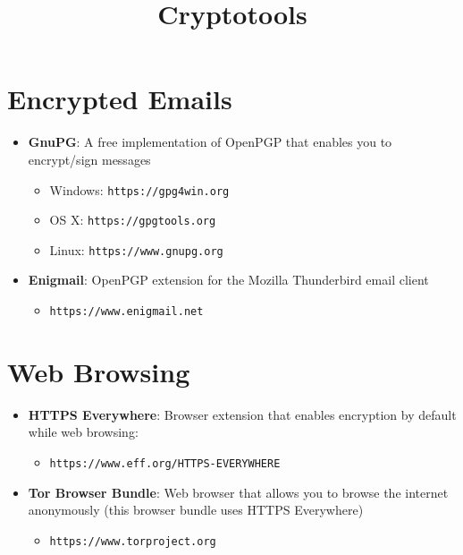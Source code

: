 \documentclass[8pt]{article}
\title{Cryptotools}
\date{}
\begin{document}
\maketitle

\section*{Encrypted Emails}

\begin{itemize}
   \item \textbf{GnuPG}: A free implementation of OpenPGP that enables you to encrypt/sign messages
      \begin{itemize}
         \item Windows: \texttt{https://gpg4win.org}
         \item OS X: \texttt{https://gpgtools.org}
         \item Linux: \texttt{https://www.gnupg.org}
      \end{itemize}
   \item \textbf{Enigmail}: OpenPGP extension for the Mozilla Thunderbird email client
      \begin{itemize}
         \item \texttt{https://www.enigmail.net}
      \end{itemize}
\end{itemize}

\section*{Web Browsing}
\begin{itemize}
   \item \textbf{HTTPS Everywhere}: Browser extension that enables encryption by default while web browsing:
       \begin{itemize}
          \item \texttt{https://www.eff.org/HTTPS-EVERYWHERE}
       \end{itemize} 
   \item \textbf{Tor Browser Bundle}: Web browser that allows you to browse the internet anonymously (this browser bundle uses HTTPS Everywhere)
       \begin{itemize}
          \item \texttt{https://www.torproject.org}
       \end{itemize} 
\end{itemize}
\end{document}
